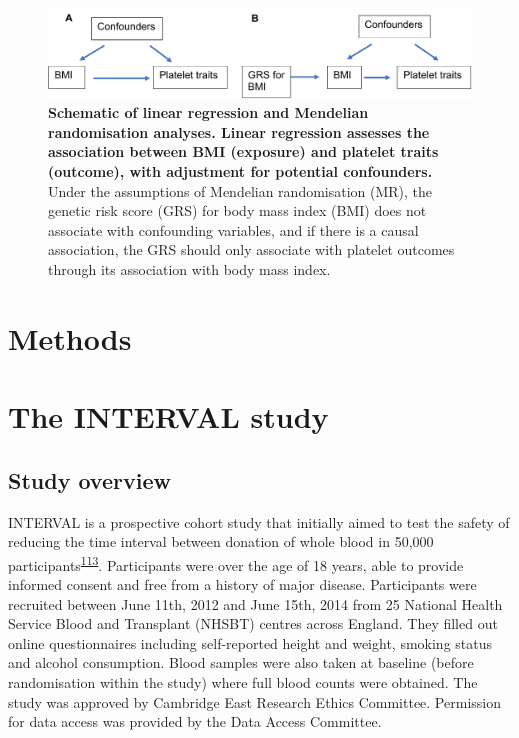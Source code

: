 \documentclass[11pt,twoside]{bristolthesis}
\begin{document}
\begin{figure}

{\centering \includegraphics[width=0.8\linewidth]{figure/BMI_platelets/obsvMRexample} 

}

\caption[Schematic of linear regression and Mendelian randomisation frameworks for BMI and platelet trait analyses]{\textbf{Schematic of linear regression and Mendelian randomisation analyses. Linear regression assesses the association between BMI (exposure) and platelet traits (outcome), with adjustment for potential confounders.} Under the assumptions of Mendelian randomisation (MR), the genetic risk score (GRS) for body mass index (BMI) does not associate with confounding variables, and if there is a causal association, the GRS should only associate with platelet outcomes through its association with body mass index.}\label{fig:Linear-reg-MR}
\end{figure}
\hypertarget{methods}{%
\section{Methods}\label{methods}}

\hypertarget{INTERVAL-study}{%
\section{The INTERVAL study}\label{INTERVAL-study}}

\hypertarget{study-overview}{%
\subsection{Study overview}\label{study-overview}}

INTERVAL is a prospective cohort study that initially aimed to test the safety of reducing the time interval between donation of whole blood in 50,000 participants\textsuperscript{\protect\hyperlink{ref-DiAngelantonio2017}{113}}. Participants were over the age of 18 years, able to provide informed consent and free from a history of major disease. Participants were recruited between June 11th, 2012 and June 15th, 2014 from 25 National Health Service Blood and Transplant (NHSBT) centres across England. They filled out online questionnaires including self-reported height and weight, smoking status and alcohol consumption. Blood samples were also taken at baseline (before randomisation within the study) where full blood counts were obtained. The study was approved by Cambridge East Research Ethics Committee. Permission for data access was provided by the Data Access Committee.
\end{document}
